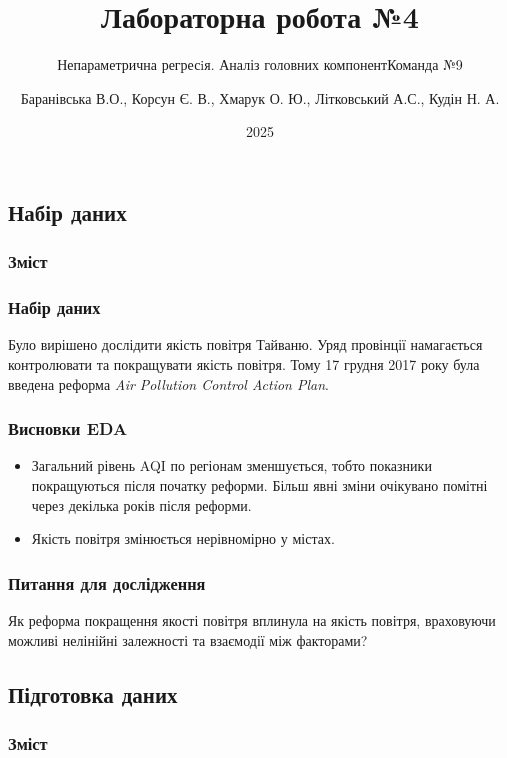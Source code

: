 ﻿\documentclass{beamer}
\title{Лабораторна робота №4}
\subtitle{Непараметрична регресiя. Аналіз головних компонент}
\subtitle{Команда №9}
\author[]{
  Баранівська В.О.,
  Корсун Є. В.,
  Хмарук О. Ю.,
  Літковський А.С.,
  Кудін Н. А.
}
\date{2025}
\begin{document}
\frame{\titlepage}

\graphicspath{{../../../}} %


\begin{frame}
  \section{Набір даних}

  \frametitle{Зміст}
  \tableofcontents[currentsection]
\end{frame}

\begin{frame}
  \frametitle{Набір даних}

  Було вирішено дослідити якість повітря Тайваню. Уряд провінції намагається
  контролювати та покращувати якість повітря. Тому 17 грудня 2017 року була введена
  реформа \textit{Air Pollution Control Action Plan}.

  \begin{center}

  \end{center}
\end{frame}

\begin{frame}
  \frametitle{Висновки EDA}
  \begin{itemize}
    \item Загальний рівень AQI по регіонам зменшується, тобто показники покращуються після початку реформи.
    Більш явні зміни очікувано помітні через декілька років після реформи.

    \item Якість повітря змінюється нерівномірно у містах.
  \end{itemize}
\end{frame}

\begin{frame}
  \frametitle{Питання для дослідження}
  Як реформа покращення якості повітря вплинула на якість повітря,
   враховуючи можливі нелінійні залежності та взаємодії між факторами?
\end{frame}

\begin{frame}
  \section{Підготовка даних}

  \frametitle{Зміст}
  \tableofcontents[currentsection]
\end{frame}
\end{document}
